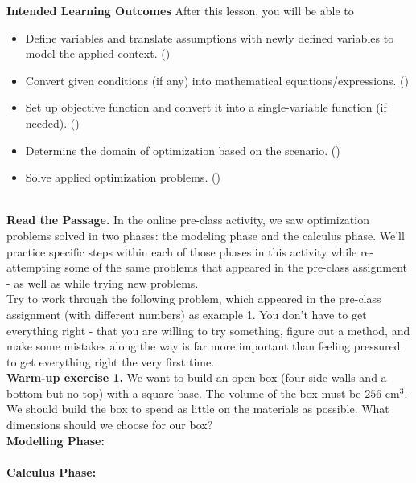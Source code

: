\documentclass[10pt]{article}
\begin{document}
\pagestyle{otherpages}
\thispagestyle{firstpage}

\textbf{Intended Learning Outcomes}
After this lesson, you will be able to 

\begin{itemize}
    \item Define variables and translate assumptions with newly defined variables to model the applied context. ()
    \item Convert given conditions (if any) into mathematical equations/expressions. ()
    \item Set up objective function and convert it into a single-variable function (if needed). ()
    \item Determine the domain of optimization based on the scenario. ()
    \item Solve applied optimization problems. ()
\end{itemize}

\vspace{-0.5cm}

\hrulefill\\

{\bf\color{blue}Read the Passage.} In the online pre-class activity, we saw optimization problems solved in two phases: the modeling phase and the calculus phase. We'll practice specific steps within each of those phases in this activity while re-attempting some of the same problems that appeared in the pre-class assignment - as well as while trying new problems.\\

Try to work through the following problem, which appeared in the pre-class assignment (with different numbers) as example 1. You don't have to get everything right - that you are willing to try something, figure out a method, and make some mistakes along the way is far more important than feeling pressured to get everything right the very first time.\\

{\bf\color{blue}Warm-up exercise 1.} We want to build an open box (four side walls and a bottom but no top) with a square base. The volume of the box must be $256$ cm$^3$. We should build the box to spend as little on the materials as possible. What dimensions should we choose for our box?\\

\textbf{Modelling Phase:}\\
~\\
\textbf{Calculus Phase:}
\end{document}
